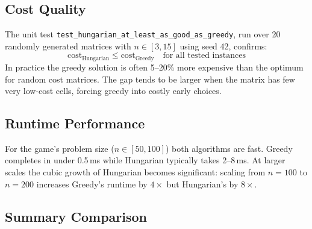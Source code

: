 \documentclass[12pt,a4paper]{article}
\begin{document}
\subsection{Cost Quality}

The unit test \texttt{test\_hungarian\_at\_least\_as\_good\_as\_greedy}, run over
20 randomly generated matrices with $n \in [3, 15]$ using seed 42, confirms:
\[
    \text{cost}_{\text{Hungarian}} \leq \text{cost}_{\text{Greedy}} \quad
    \text{for all tested instances}
\]
In practice the greedy solution is often 5--20\% more expensive than the optimum
for random cost matrices. The gap tends to be larger when the matrix has few very
low-cost cells, forcing greedy into costly early choices.

\subsection{Runtime Performance}

For the game's problem size ($n \in [50, 100]$) both algorithms are fast. Greedy
completes in under 0.5\,ms while Hungarian typically takes 2--8\,ms. At larger
scales the cubic growth of Hungarian becomes significant: scaling from $n = 100$
to $n = 200$ increases Greedy's runtime by $4\times$ but Hungarian's by $8\times$.

\subsection{Summary Comparison}
\end{document}
